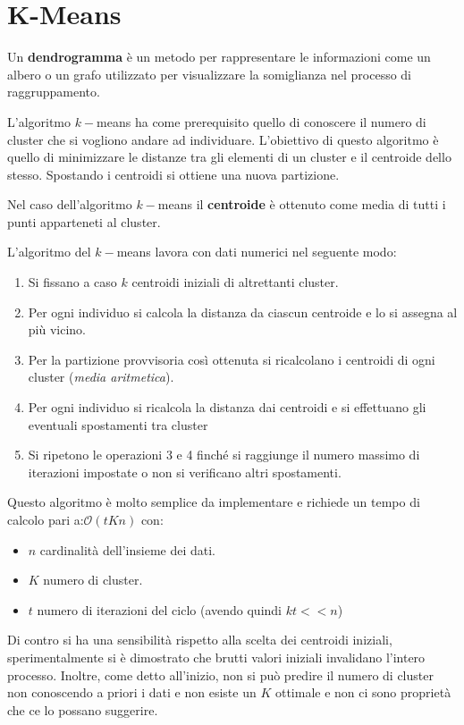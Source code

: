 \section{K-Means}
\begin{definizione}
    Un \textbf{dendrogramma} è un metodo per rappresentare le informazioni come un albero o un grafo utilizzato per visualizzare la somiglianza nel processo di raggruppamento.
\end{definizione}
L'algoritmo $k-$means ha come prerequisito quello di conoscere il numero di cluster che si vogliono andare ad individuare. L'obiettivo di questo algoritmo è quello di minimizzare le distanze tra gli elementi di un cluster e il centroide dello stesso. Spostando i centroidi si ottiene una nuova partizione.
\begin{definizione}
    Nel caso dell'algoritmo $k-$means il \textbf{centroide} è ottenuto come media di tutti i punti apparteneti al cluster.  
\end{definizione}
L'algoritmo del $k-$means lavora con dati numerici nel seguente modo:
\begin{enumerate}
    \item Si fissano a caso $k$ centroidi iniziali di altrettanti cluster.
    \item Per ogni individuo si calcola la distanza da ciascun centroide e lo si assegna al più vicino.
    \item Per la partizione provvisoria così ottenuta si ricalcolano i centroidi di ogni cluster (\textit{media aritmetica}).
    \item Per ogni individuo si ricalcola la distanza dai centroidi e si effettuano gli eventuali spostamenti tra cluster
    \item Si ripetono le operazioni 3 e 4 finché si raggiunge il numero massimo di iterazioni impostate o non si verificano altri spostamenti.
\end{enumerate}
Questo algoritmo è molto semplice da implementare e richiede un tempo di calcolo pari a:$\mathcal{O}(tKn)$ con:
\begin{itemize}
    \item $n$ cardinalità dell'insieme dei dati.
    \item $K$ numero di cluster.
    \item $t$ numero di iterazioni del ciclo (avendo quindi $kt << n$)
\end{itemize}
Di contro si ha una sensibilità rispetto alla scelta dei centroidi iniziali, sperimentalmente si è dimostrato che brutti valori iniziali invalidano l'intero processo. Inoltre, come detto all'inizio, non si può predire il numero di cluster non conoscendo a priori i dati e non esiste un $K$ ottimale e non ci sono proprietà che ce lo possano suggerire.

